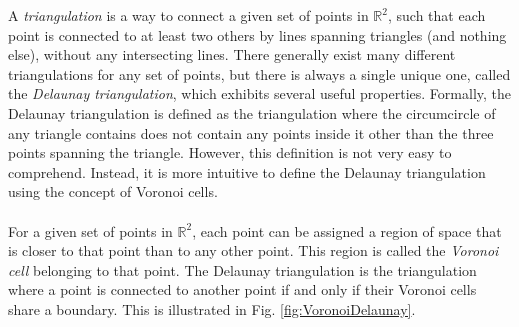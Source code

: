 \documentclass{article}
\begin{document}
A \emph{triangulation} is a way to connect a given set of points in $\mathbb{R}^{2}$, such that each point is connected to at least two others by lines spanning triangles (and nothing else), without any intersecting lines. There generally exist many different triangulations for any set of points, but there is always a single unique one, called the \emph{Delaunay triangulation}, which exhibits several useful properties. Formally, the Delaunay triangulation is defined as the triangulation where the circumcircle of any triangle contains does not contain any points inside it other than the three points spanning the triangle. However, this definition is not very easy to comprehend. Instead, it is more intuitive to define the Delaunay triangulation using the concept of Voronoi cells.\\
\\
For a given set of points in $\mathbb{R}^{2}$, each point can be assigned a region of space that is closer to that point than to any other point. This region is called the \emph{Voronoi cell} belonging to that point. The Delaunay triangulation is the triangulation where a point is connected to another point if and only if their Voronoi cells share a boundary. This is illustrated in Fig. \ref{fig:VoronoiDelaunay}.
\end{document}
